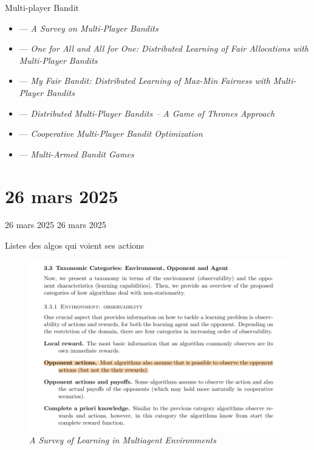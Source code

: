 \documentclass[aspectratio=169,xcolor=dvipsnames]{beamer}
\begin{document}
\begin{frame}{Multi-player Bandit}
\begin{itemize}
    \item \citet{boursier_survey_nodate} --- \textit{A Survey on Multi-Player Bandits}
    \item \citet{bistritz_one_2021} --- \textit{One for All and All for One: Distributed Learning of Fair Allocations with Multi-Player Bandits}
    \item \citet{bistritz_my_2020} --- \textit{My Fair Bandit: Distributed Learning of Max-Min Fairness with Multi-Player Bandits}
    \item \citet{bistritz_distributed_2018} --- \textit{Distributed Multi-Player Bandits -- A Game of Thrones Approach}
    \item \citet{bistritz_cooperative_2020} --- \textit{Cooperative Multi-Player Bandit Optimization}
    \item \citet{gursoy_multi-armed_2024} --- \textit{Multi-Armed Bandit Games}
\end{itemize}
\end{frame}


\section{26 mars 2025}
\begin{frame}{26 mars 2025}
26 mars 2025
\end{frame}


\begin{frame}{Listes des algos qui voient ses actions}
  \begin{figure}
    \centering
    \includegraphics[scale=0.20]{actions_bac.png}
\caption{\citet{hernandez-leal_survey_2019-1} \textit{A Survey of Learning in Multiagent Environments}}
  \end{figure}
\end{frame}
\end{document}
